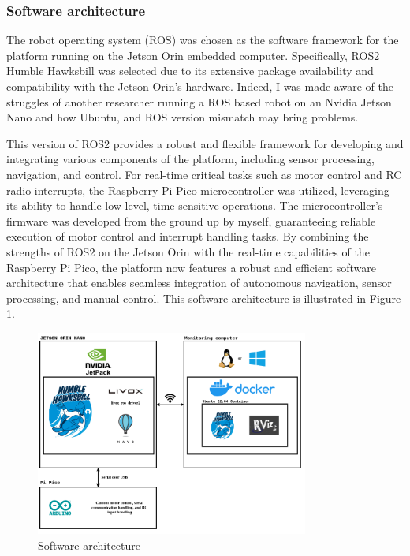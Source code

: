 \documentclass[12pt]{article}
\begin{document}
        
        
        \subsubsection{Software architecture}


        The robot operating system (ROS) was chosen as the software framework for the platform running on the Jetson Orin embedded computer. Specifically, ROS2 Humble Hawksbill was selected due to its extensive package availability and compatibility with the Jetson Orin's hardware. Indeed, I was made aware of the struggles of another researcher running a ROS based robot on an Nvidia Jetson Nano and how Ubuntu, and ROS version mismatch may bring problems. 
        
        This version of ROS2 provides a robust and flexible framework for developing and integrating various components of the platform, including sensor processing, navigation, and control. For real-time critical tasks such as motor control and RC radio interrupts, the Raspberry Pi Pico microcontroller was utilized, leveraging its ability to handle low-level, time-sensitive operations. The microcontroller's firmware was developed from the ground up by myself, guaranteeing reliable execution of motor control and interrupt handling tasks. By combining the strengths of ROS2 on the Jetson Orin with the real-time capabilities of the Raspberry Pi Pico, the platform now features a robust and efficient software architecture that enables seamless integration of autonomous navigation, sensor processing, and manual control. This software architecture is illustrated in Figure \ref{fig:SW_architecture}.

        \begin{figure}[H]
            \centering
            \includegraphics[width=0.8\textwidth]{Images/Software architecture rover.drawio.png}
            \caption{Software architecture}
            \label{fig:SW_architecture}
        \end{figure}
\end{document}
